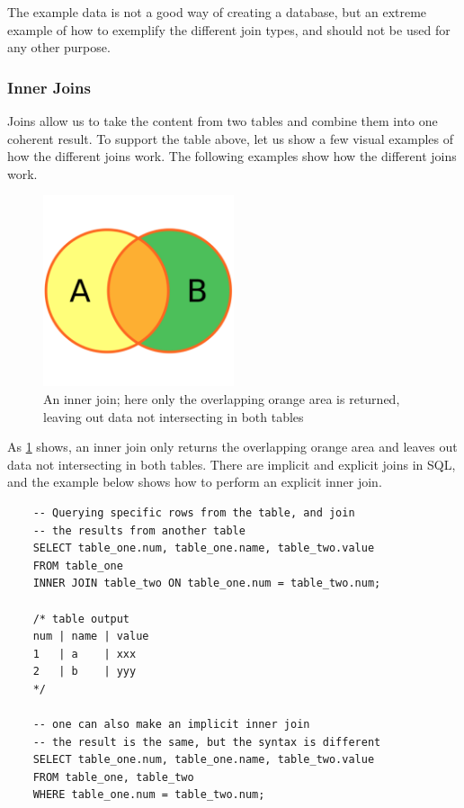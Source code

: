 The example data is not a good way of creating a database, but an extreme example of how to exemplify the different join types, and should not be used for any other purpose.

\subsubsection{Inner Joins}
Joins allow us to take the content from two tables and combine them into one coherent result. To support the table above, let us show a few visual examples of how the different joins work. The following examples show how the different joins work.

\begin{figure}[H]
    \centering
    \includegraphics[width=0.5\textwidth]{content/1-relational-databases/figures/joins/innerjoin.png}
    \caption{An inner join; here only the overlapping orange area is returned, leaving out data not intersecting in both tables}
    \label{fig:1.innerjoin}
\end{figure}

As \cref{fig:1.innerjoin} shows, an inner join only returns the overlapping orange area and leaves out data not intersecting in both tables. There are implicit and explicit joins in SQL, and the example below shows how to perform an explicit inner join.

\begin{verbatim}
    -- Querying specific rows from the table, and join 
    -- the results from another table
    SELECT table_one.num, table_one.name, table_two.value
    FROM table_one
    INNER JOIN table_two ON table_one.num = table_two.num;

    /* table output
    num | name | value
    1   | a    | xxx
    2   | b    | yyy
    */

    -- one can also make an implicit inner join
    -- the result is the same, but the syntax is different
    SELECT table_one.num, table_one.name, table_two.value
    FROM table_one, table_two
    WHERE table_one.num = table_two.num;
\end{verbatim}

